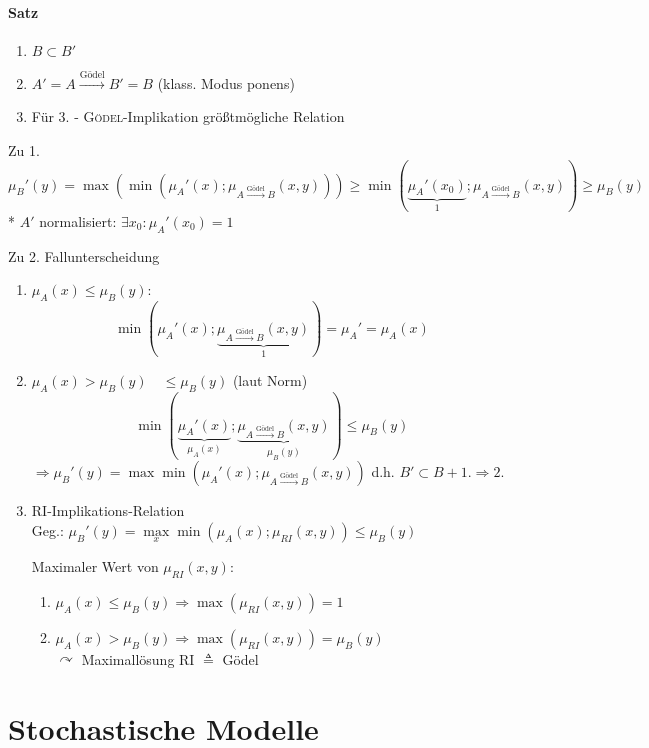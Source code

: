 \documentclass[a4paper]{scrartcl}
\begin{document}
\paragraph{Satz}
\begin{enumerate}
\item $B \subset B'$
\item $A' = A \xrightarrow{\text{Gödel}} B'=B$ (klass. Modus ponens)
\item Für 3. - \textsc{Gödel}-Implikation größtmögliche Relation
\end{enumerate}

Zu 1. $\mu_B' (y) = \max ( \min (\mu_A'(x);\mu_{A \xrightarrow{\text{Gödel}} B}(x,y))) \geq
\min (\underbrace{\mu_A'(x_0)}_{1};\mu_{A \xrightarrow{\text{Gödel}} B} (x,y)) \geq \mu_B(y)$\\*
$A'$ normalisiert: $\exists x_0 : \mu_A'(x_0) = 1$

Zu 2. Fallunterscheidung\\
\begin{enumerate}
\item $\mu_A(x) \leq \mu_B(y):$
\[ \min (\mu_A' (x); \underbrace{\mu_{A \xrightarrow{\text{Gödel}} B} (x,y)}_{1} ) =  \mu_A' = \mu_A(x)\]
\item $\mu_A(x) > \mu_B(y) \quad \leq \mu_B(y)$ (laut Norm)
\[ \min ( \underbrace{\mu_A'(x)}_{\mu_A(x)};\underbrace{\mu_{A \xrightarrow{\text{Gödel}} B} (x,y)}_{\mu_B(y)} ) \leq \mu_B (y) \]
$\Rightarrow \mu_B' (y) = \max \min (\mu_A' (x) ; \mu_{A \xrightarrow{\text{Gödel}} B} (x,y))$
d.h. $B' \subset B + 1. \Rightarrow 2.$
\item RI-Implikations-Relation\\
Geg.: $\mu_B' (y) = \max\limits_x \min (\mu_A(x); \mu_{RI} (x,y)) \leq \mu_B(y)$

Maximaler Wert von $\mu_{RI} (x,y):$
\begin{enumerate}
\item $\mu_A(x) \leq \mu_B(y) \Rightarrow \max (\mu_{RI} (x,y) ) = 1$
\item $ \mu_A(x) > \mu_B(y) \Rightarrow \max (\mu_{RI} (x,y) ) = \mu_B(y)$\\
$\curvearrowright$ Maximallösung RI $\triangleq$ Gödel
\end{enumerate}


\end{enumerate}




\section{Stochastische Modelle}
\end{document}
